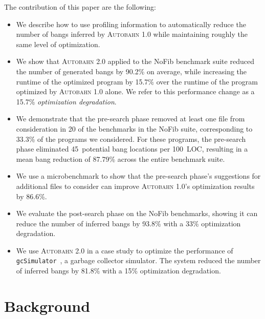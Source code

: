\documentclass[format=sigplan, review=true, 9pt]{acmart}
\newcommand{\cut}[1]{}
\newcommand{\acut}[1]{}
\newcommand{\Ao}[0]{\textsc{Autobahn 1.0}}
\newcommand{\At}[0]{\textsc{Autobahn 2.0}}
\newcommand{\preopt}[0]{pre-search}
\newcommand{\postopt}[0]{post-search}
\begin{document}
The contribution of this paper are the following:
\begin{itemize}
  \item We describe how to use profiling information to automatically reduce the number
    of bangs inferred by \Ao{} while maintaining roughly the same
    level of optimization.
  \item We show that \At{} applied to the NoFib benchmark suite reduced
    the number of generated bangs by 90.2\% on average, while
    increasing the runtime of the optimized program by 15.7\% over the
    runtime of the program optimized by \Ao{} alone. We refer to this
    performance change as a 15.7\% \textit{optimization degradation}.
\cut{(2.0 runtime - 1.0 runtime)/original}
  \item We demonstrate that the \preopt{} phase removed at least
    one file from consideration in 20 of the benchmarks in the NoFib
    suite, corresponding to 33.3\% of the programs we considered.
    For these programs, the \preopt{} phase eliminated
    45~potential bang locations per 100~LOC, resulting in a mean bang
    reduction of 87.79\% across the entire benchmark suite. 
  \item We use a microbenchmark to show that the \preopt{} phase's
    suggestions for additional files to consider can improve \Ao{}'s
    optimization results by 86.6\%.
  \item We evaluate the \postopt{} phase on the NoFib benchmarks,
    showing it can reduce the number of inferred bangs by
    93.8\% with a 33\% optimization degradation.
  \item We use \At{} in a case study to optimize the performance of 
    \texttt{gcSimulator}~\cite{Ricci13}, a garbage collector
    simulator. The system reduced the number of inferred bangs by
    81.8\% with a 15\% optimization degradation.
\acut{
  \item We apply \At{} in a second case study to show that it can
    preserve the application-specific annotations inferred by \Ao{}
    for two different uses of the Aeson~\cite{aeson} library.}
\end{itemize}


\section{Background}
\end{document}
